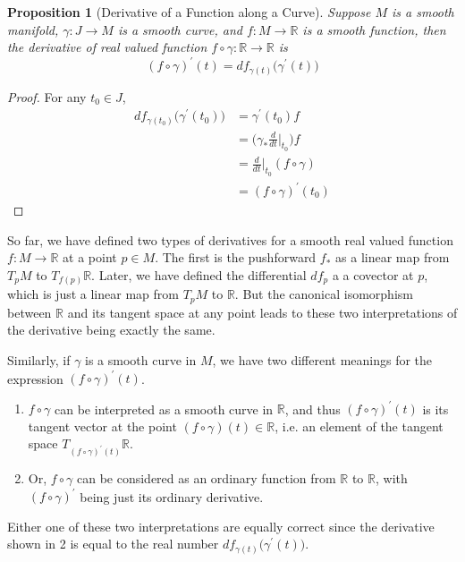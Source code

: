 \documentclass{article}
\newtheorem{proposition}[theorem]{Proposition}
\theoremstyle{remark}
\theoremstyle{definition}
\begin{document}
    \begin{proposition}[Derivative of a Function along a Curve]
    Suppose $M$ is a smooth manifold, $\gamma: J \longrightarrow M$ is a smooth curve, and $f: M \longrightarrow \mathbb{R}$ is a smooth function, then the derivative of real valued function $f \circ \gamma: \mathbb{R} \longrightarrow \mathbb{R}$ is 
    \[(f \circ \gamma)^\prime (t) = df_{\gamma(t)} \big( \gamma^\prime(t) \big)\]
    \end{proposition}
    \begin{proof}
    For any $t_0 \in J$,
    \begin{align*}
        df_{\gamma(t_0)} \big( \gamma^\prime (t_0)\big) & = \gamma^\prime (t_0) f \\
        & = \bigg( \gamma_* \frac{d}{dt} \bigg|_{t_0} \bigg) f \\
        & = \frac{d}{dt} \bigg|_{t_0} (f \circ \gamma) \\
        & = (f \circ \gamma)^\prime (t_0) 
    \end{align*}
    \end{proof}

    So far, we have defined two types of derivatives for a smooth real valued function $f: M \longrightarrow \mathbb{R}$ at a point $p \in M$. The first is the pushforward $f_*$ as a linear map from $T_p M$ to $T_{f(p)} \mathbb{R}$. Later, we have defined the differential $df_p$ a a covector at $p$, which is just a linear map from $T_p M$ to $\mathbb{R}$. But the canonical isomorphism between $\mathbb{R}$ and its tangent space at any point leads to these two interpretations of the derivative being exactly the same. 

    Similarly, if $\gamma$ is a smooth curve in $M$, we have two different meanings for the expression $(f \circ \gamma)^\prime (t)$. 
    \begin{enumerate}
        \item $f \circ \gamma$ can be interpreted as a smooth curve in $\mathbb{R}$, and thus $(f \circ \gamma)^\prime (t)$ is its tangent vector at the point $(f \circ \gamma) (t) \in \mathbb{R}$, i.e. an element of the tangent space $T_{(f \circ \gamma)^\prime (t)} \mathbb{R}$. 
        \item Or, $f \circ \gamma$ can be considered as an ordinary function from $\mathbb{R}$ to $\mathbb{R}$, with $(f \circ \gamma)^\prime$ being just its ordinary derivative. 
    \end{enumerate}
    Either one of these two interpretations are equally correct since the derivative shown in 2 is equal to the real number $df_{\gamma(t)} \big( \gamma^\prime (t)\big)$. 
\end{document}

